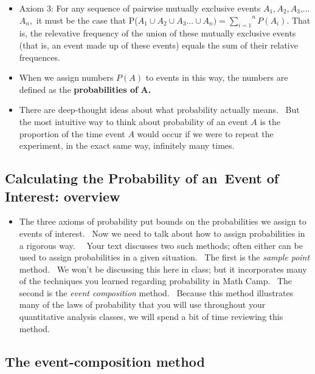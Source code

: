 \documentclass[11pt]{article}
\begin{document}
\begin{itemize}
\begin{itemize}
\item Axiom 3: For any sequence of pairwise mutually exclusive events $%
A_{1},A_{2},A_{3}$,...$A_{n},$ it must be the case that P($A_{1}\cup
A_{2}\cup A_{3}...\cup A_{n})=\overset{n}{\underset{i=1}{\sum }}P(A_{i}).$
That is, the relevative frequency of the union of these mutually exclusive
events (that is, an event made up of these events) equals the sum of their
relative frequences. \ 

\item When we assign numbers $P(A)$ to events in this way, the numbers are
defined as the \textbf{probabilities of }$\mathbf{A}$\textbf{.}

\item There are deep-thought ideas about what probability actually means. \
But the most intuitive way to think about probability of an event $A$ is the
proportion of the time event $A$ would occur if we were to repeat the
experiment, in the exact same way, infinitely many times.
\end{itemize}
\end{itemize}

\subsection{Calculating the Probability of an\ Event of Interest: overview}

\begin{itemize}
\item The three axioms of probability put bounds on the probabilities we
assign to events of interest. \ Now we need to talk about how to assign
probabilities in a rigorous way. \ \ Your text discusses two such methods;
often either can be used to assign probabilities in a given situation. \ The
first is the \textit{sample point }method. \ We won't be discussing this
here in class; but it incorporates many of the techniques you learned
regarding probability in Math Camp. \ The second is the \textit{event
composition} method. \ Because this method illustrates many of the laws of
probability that you will use throughout your quantitative analysis classes,
we will spend a bit of time reviewing this method. \ 
\end{itemize}

\subsection{The event-composition method}
\end{document}
